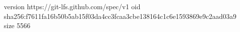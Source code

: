 version https://git-lfs.github.com/spec/v1
oid sha256:f7611fa16b50b5ab15f03da4cc3fcaa3cbe138164c1c6e1593869e9c2aad03a9
size 5566
